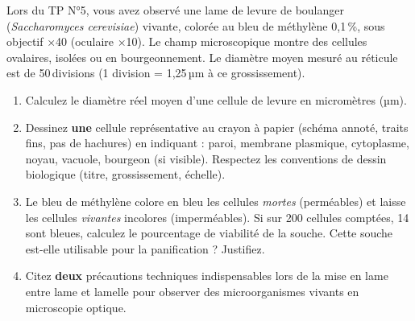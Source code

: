 \documentclass[11pt]{article}
\begin{document}
\begin{exercice}
Lors du TP N°5, vous avez observé une lame de levure de boulanger (\emph{Saccharomyces cerevisiae}) vivante, colorée au bleu de méthylène 0,1\,\%, sous objectif ×40 (oculaire ×10). Le champ microscopique montre des cellules ovalaires, isolées ou en bourgeonnement. Le diamètre moyen mesuré au réticule est de 50\,divisions (1 division = 1,25\,µm à ce grossissement).

\begin{enumerate}
    \item Calculez le diamètre réel moyen d'une cellule de levure en micromètres (µm).
    \item Dessinez \textbf{une} cellule représentative au crayon à papier (schéma annoté, traits fins, pas de hachures) en indiquant : paroi, membrane plasmique, cytoplasme, noyau, vacuole, bourgeon (si visible). Respectez les conventions de dessin biologique (titre, grossissement, échelle).
    \item Le bleu de méthylène colore en bleu les cellules \emph{mortes} (perméables) et laisse les cellules \emph{vivantes} incolores (imperméables). Si sur 200 cellules comptées, 14 sont bleues, calculez le pourcentage de viabilité de la souche. Cette souche est-elle utilisable pour la panification ? Justifiez.
    \item Citez \textbf{deux} précautions techniques indispensables lors de la mise en lame entre lame et lamelle pour observer des microorganismes vivants en microscopie optique.
\end{enumerate}
\end{exercice}
\end{document}
